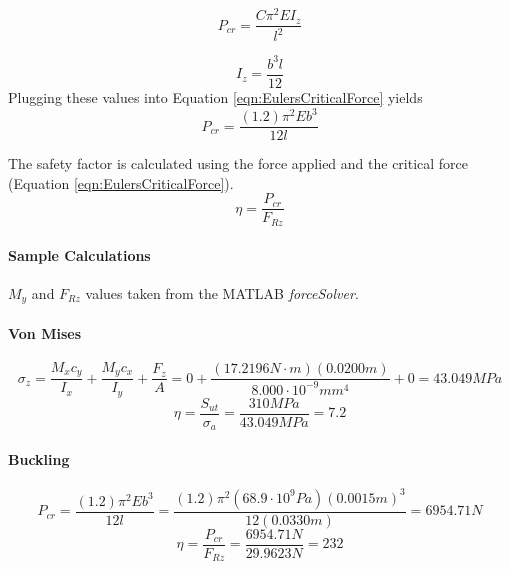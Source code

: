 \documentclass[../main.tex]{subfiles}
\begin{document}
\begin{equation} \label{eqn:EulersCriticalForce}
P_{cr} = \frac{C\pi^2EI_z}{l^2}
\end{equation}

\begin{equation}
I_z = \frac{b^3l}{12}
\end{equation}
Plugging these values into Equation \ref{eqn:EulersCriticalForce} yields
\begin{equation}
P_{cr} = \frac{(1.2)\pi^2Eb^3}{12l}
\end{equation}

The safety factor is calculated using the force applied and the critical force (Equation \ref{eqn:EulersCriticalForce}).
\begin{equation}
\eta = \frac{P_{cr}}{F_{Rz}}
\end{equation}

\paragraph*{Sample Calculations}
$M_y$ and $F_{Rz}$ values taken from the MATLAB \textit{forceSolver}.
\paragraph*{Von Mises}
$$\sigma_{z}={\frac{M_{x}c_y}{I_x}}+{\frac{M_{y}c_x}{I_y}}+{\frac{F_z}{A}}=0+\frac{(17.2196N\cdot{}m)(0.0200m)}{8.000\cdot{}10^{-9}mm^4}+0 = 43.049MPa$$
$$\eta = \dfrac{S_{ut}}{\sigma _a} = \dfrac{310MPa}{43.049MPa}=7.2$$
\paragraph*{Buckling}
$$P_{cr} = \frac{(1.2)\pi^2Eb^3}{12l}=\frac{(1.2)\pi^2(68.9\cdot{}10^9Pa)(0.0015m)^3}{12(0.0330m)}=6954.71N$$
$$\eta = \frac{P_{cr}}{F_{Rz}} = \frac{6954.71N}{29.9623N} = 232$$
\end{document}
